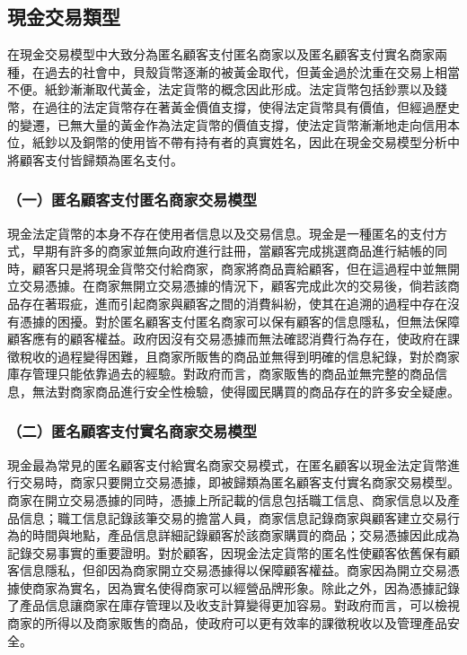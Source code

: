 	\subsection{現金交易類型}
	在現金交易模型中大致分為匿名顧客支付匿名商家以及匿名顧客支付實名商家兩種，在過去的社會中，貝殼貨幣逐漸的被黃金取代，但黃金過於沈重在交易上相當不便。紙鈔漸漸取代⿈⾦，法定貨幣的概念因此形成。法定貨幣包括鈔票以及錢幣，在過往的法定貨幣存在著黃金價值支撐，使得法定貨幣具有價值，但經過歷史的變遷，已無⼤量的黃金作為法定貨幣的價值⽀撐，使法定貨幣漸漸地⾛向信⽤本位，紙鈔以及銅幣的使用皆不帶有持有者的真實姓名，因此在現金交易模型分析中將顧客支付皆歸類為匿名支付。

		\subsubsection{（一）匿名顧客支付匿名商家交易模型}
		現金法定貨幣的本身不存在使用者信息以及交易信息。現⾦是一種匿名的支付方式，早期有許多的商家並無向政府進行註冊，當顧客完成挑選商品進行結帳的同時，顧客只是將現金貨幣交付給商家，商家將商品賣給顧客，但在這過程中並無開立交易憑據。在商家無開立交易憑據的情況下，顧客完成此次的交易後，倘若該商品存在著瑕疵，進而引起商家與顧客之間的消費糾紛，使其在追溯的過程中存在沒有憑據的困擾。對於匿名顧客支付匿名商家可以保有顧客的信息隱私，但無法保障顧客應有的顧客權益。政府因沒有交易憑據而無法確認消費行為存在，使政府在課徵稅收的過程變得困難，且商家所販售的商品並無得到明確的信息紀錄，對於商家庫存管理只能依靠過去的經驗。對政府而言，商家販售的商品並無完整的商品信息，無法對商家商品進行安全性檢驗，使得國民購買的商品存在的許多安全疑慮。

		\subsubsection{（二）匿名顧客支付實名商家交易模型}
		現⾦最為常⾒的匿名顧客⽀付給實名商家交易模式，在匿名顧客以現⾦法定貨幣進⾏交易時，商家只要開⽴交易憑據，即被歸類為匿名顧客⽀付實名商家交易模型。商家在開⽴交易憑據的同時，憑據上所記載的信息包括職⼯信息、商家信息以及產品信息；職⼯信息記錄該筆交易的擔當人員，商家信息記錄商家與顧客建立交易行為的時間與地點，產品信息詳細記錄顧客於該商家購買的商品；交易憑據因此成為記錄交易事實的重要證明。對於顧客，因現⾦法定貨幣的匿名性使顧客依舊保有顧客信息隱私，但卻因為商家開⽴交易憑據得以保障顧客權益。商家因為開⽴交易憑據使商家為實名，因為實名使得商家可以經營品牌形象。除此之外，因為憑據記錄了產品信息讓商家在庫存管理以及收支計算變得更加容易。對政府⽽⾔，可以檢視商家的所得以及商家販售的商品，使政府可以更有效率的課徵稅收以及管理產品安全。


